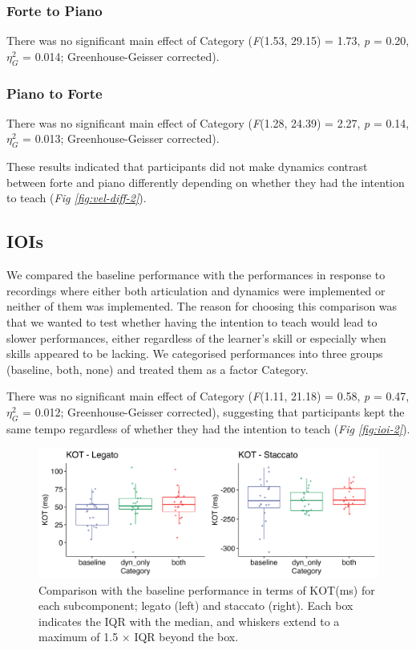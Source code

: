 \documentclass[
  man,floatsintext]{apa6}
\begin{document}
\hypertarget{forte-to-piano-1}{%
\subsubsection{Forte to Piano}\label{forte-to-piano-1}}

There was no significant main effect of Category (\emph{F}(1.53, 29.15) = 1.73, \emph{p} = 0.20, \(\eta_G^2\) = 0.014; Greenhouse-Geisser corrected).

\hypertarget{piano-to-forte-1}{%
\subsubsection{Piano to Forte}\label{piano-to-forte-1}}

There was no significant main effect of Category (\emph{F}(1.28, 24.39) = 2.27, \emph{p} = 0.14, \(\eta_G^2\) = 0.013; Greenhouse-Geisser corrected).

These results indicated that participants did not make dynamics contrast between forte and piano differently depending on whether they had the intention to teach (\emph{Fig \ref{fig:vel-diff-2}}).

\hypertarget{iois-1}{%
\subsection{IOIs}\label{iois-1}}

We compared the baseline performance with the performances in response to recordings where either both articulation and dynamics were implemented or neither of them was implemented. The reason for choosing this comparison was that we wanted to test whether having the intention to teach would lead to slower performances, either regardless of the learner's skill or especially when skills appeared to be lacking. We categorised performances into three groups (baseline, both, none) and treated them as a factor Category.

There was no significant main effect of Category (\emph{F}(1.11, 21.18) = 0.58, \emph{p} = 0.47, \(\eta_G^2\) = 0.012; Greenhouse-Geisser corrected), suggesting that participants kept the same tempo regardless of whether they had the intention to teach (\emph{Fig \ref{fig:ioi-2}}).

\begin{figure}
\includegraphics[width=1\linewidth]{manuscript_files/figure-latex/plot-kot-2-1} \caption{\label{fig:kot-2}Comparison with the baseline performance in terms of KOT(ms) for each subcomponent; legato (left) and staccato (right). Each box indicates the IQR with the median, and whiskers extend to a maximum of 1.5 × IQR beyond the box.}\label{fig:plot-kot-2}
\end{figure}
\end{document}
